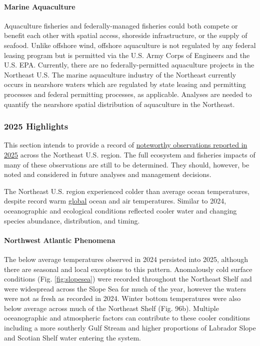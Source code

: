 \documentclass[
  10pt,
]{article}
\begin{document}
\paragraph{Marine Aquaculture}\label{marine-aquaculture}

Aquaculture fisheries and federally-managed fisheries could both compete or benefit each other with spatial access, shoreside infrastructure, or the supply of seafood. Unlike offshore wind, offshore aquaculture is not regulated by any federal leasing program but is permitted via the U.S. Army Corps of Engineers and the U.S. EPA. Currently, there are no federally-permitted aquaculture projects in the Northeast U.S. The marine aquaculture industry of the Northeast currently occurs in nearshore waters which are regulated by state leasing and permitting processes and federal permitting processes, as applicable. Analyses are needed to quantify the nearshore spatial distribution of aquaculture in the Northeast.

\newpage

\subsubsection{2025 Highlights}\label{highlights}

This section intends to provide a record of \href{https://noaa-edab.github.io/catalog/observation_synthesis_2025.html}{noteworthy observations reported in 2025} across the Northeast U.S. region. The full ecosystem and fisheries impacts of many of these observations are still to be determined. They should, however, be noted and considered in future analyses and management decisions.

The Northeast U.S. region experienced colder than average ocean temperatures, despite record warm \href{https://www.ncei.noaa.gov/news/global-climate-202513}{global} ocean and air temperatures. Similar to 2024, oceanographic and ecological conditions reflected cooler water and changing species abundance, distribution, and timing.

\paragraph{Northwest Atlantic Phenomena}\label{northwest-atlantic-phenomena}

The below average temperatures observed in 2024 persisted into 2025, although there are seasonal and local exceptions to this pattern. Anomalously cold surface conditions (Fig. \ref{fig:slopesea}) were recorded throughout the Northeast Shelf and were widespread across the Slope Sea for much of the year, however the waters were not as fresh as recorded in 2024. Winter bottom temperatures were also below average across much of the Northeast Shelf (Fig. 96b). Multiple oceanographic and atmospheric factors can contribute to these cooler conditions including a more southerly Gulf Stream and higher proportions of Labrador Slope and Scotian Shelf water entering the system.
\end{document}
